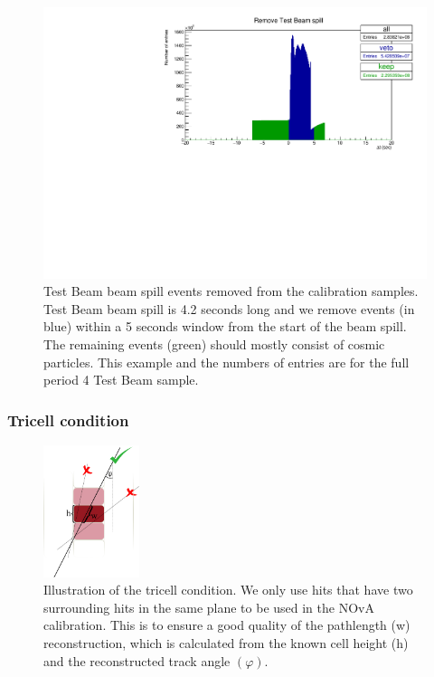 \documentclass[12pt,a4paper]{article}
\begin{document}
\begin{figure}[hbtp]
\centering
\includegraphics[width=\textwidth]{Plots/RemoveTBSpills.pdf}
\caption{Test Beam beam spill events removed from the calibration samples. Test Beam beam spill is 4.2 seconds long and we remove events (in blue) within a 5 seconds window from the start of the beam spill. The remaining events (green) should mostly consist of cosmic particles. This example and the numbers of entries are for the full period 4 Test Beam sample.}
\end{figure}


\subsubsection*{Tricell condition}
\begin{figure}[hbtp]
\centering
\includegraphics[width=0.25\textwidth]{Plots/TricellConditionWithDescription.png}
\caption{Illustration of the tricell condition. We only use hits that have two surrounding hits in the same plane to be used in the NOvA calibration. This is to ensure a good quality of the pathlength (w) reconstruction, which is calculated from the known cell height (h) and the reconstructed track angle $\left(\varphi\right)$.}
\end{figure}
\end{document}

